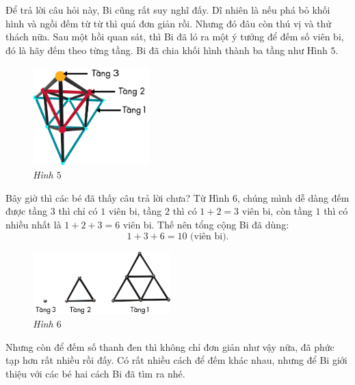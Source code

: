 	\vskip 0.1cm
	\begin{multicols}{2}
		Để trả lời câu hỏi này, Bi cũng rất suy nghĩ đấy. Dĩ nhiên là nếu phá bỏ khối hình và ngồi đếm từ từ thì quá đơn giản rồi. Nhưng đó đâu còn thú vị và thử thách nữa. Sau một hồi quan sát, thì Bi đã ló ra một ý tưởng để đếm số viên bi, đó là hãy đếm theo từng tầng. Bi đã chia khối hình thành ba tầng như Hình $5$.
		\begin{figure}[H]
			\centering
			\vspace*{5pt}
			\captionsetup{labelformat= empty, justification=centering} \includegraphics[width=0.4\textwidth]{5}
			\caption{\small\textit{Hình $5$}}
			\vspace*{-5pt}
		\end{figure}
	\end{multicols}
	Bây giờ thì các bé đã thấy câu trả lời chưa? Từ  Hình $6$, chúng mình dễ dàng đếm được tầng $3$ thì chỉ có $1$ viên bi, tầng $2$ thì có $1+2 = 3$ viên bi, còn tầng $1$ thì có nhiều nhất là $1 + 2 + 3 = 6$ viên bi. Thế nên tổng cộng Bi đã dùng:
	$$1 + 3 + 6 = 10 \text{ (viên bi)}.$$
	\begin{multicols}{2}
		\begin{figure}[H]
			\centering
			\vspace*{5pt}
			\captionsetup{labelformat= empty, justification=centering} \includegraphics[width=0.475\textwidth]{6}
			\caption{\small\textit{Hình $6$}}
			\vspace*{-10pt}
		\end{figure}
		Nhưng còn để đếm số thanh đen thì không chỉ đơn giản như vậy nữa, đã phức tạp hơn rất nhiều rồi đấy. Có rất nhiều cách để đếm khác nhau, nhưng để Bi giới thiệu với các bé hai cách Bi đã tìm ra nhé.
	\end{multicols}
